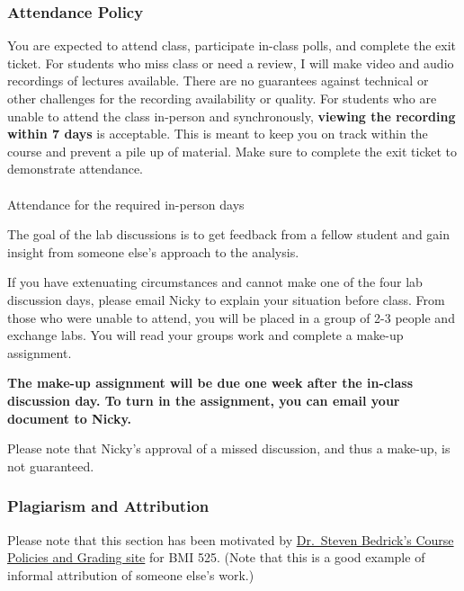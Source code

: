 \documentclass[
  letterpaper,
  DIV=11,
  numbers=noendperiod]{scrartcl}
\makeatletter
\let\oldparagraph\paragraph
\renewcommand{\paragraph}{
    \@ifstar
      \xxxParagraphStar
      \xxxParagraphNoStar
  }
\newcommand{\xxxParagraphStar}[1]{\oldparagraph*{#1}\mbox{}}
\newcommand{\xxxParagraphNoStar}[1]{\oldparagraph{#1}\mbox{}}
\makeatother
\begin{document}
\subsubsection{Attendance Policy}\label{attendance-policy}

You are expected to attend class, participate in-class polls, and
complete the exit ticket. For students who miss class or need a review,
I will make video and audio recordings of lectures available. There are
no guarantees against technical or other challenges for the recording
availability or quality. For students who are unable to attend the class
in-person and synchronously, \textbf{viewing the recording within 7
days} is acceptable. This is meant to keep you on track within the
course and prevent a pile up of material. Make sure to complete the exit
ticket to demonstrate attendance.

\paragraph{Attendance for the required in-person
days}\label{attendance-for-the-required-in-person-days}

The goal of the lab discussions is to get feedback from a fellow student
and gain insight from someone else's approach to the analysis.

If you have extenuating circumstances and cannot make one of the four
lab discussion days, please email Nicky to explain your situation before
class. From those who were unable to attend, you will be placed in a
group of 2-3 people and exchange labs. You will read your groups work
and complete a make-up assignment.

\textbf{The make-up assignment will be due one week after the in-class
discussion day. To turn in the assignment, you can email your document
to Nicky.}

Please note that Nicky's approval of a missed discussion, and thus a
make-up, is not guaranteed.

\subsubsection{Plagiarism and
Attribution}\label{plagiarism-and-attribution}

Please note that this section has been motivated by
\href{https://dmice.ohsu.edu/bedricks/courses/bmi525/policies.html}{Dr.~Steven
Bedrick's Course Policies and Grading site} for BMI 525. (Note that this
is a good example of informal attribution of someone else's work.)
\end{document}
